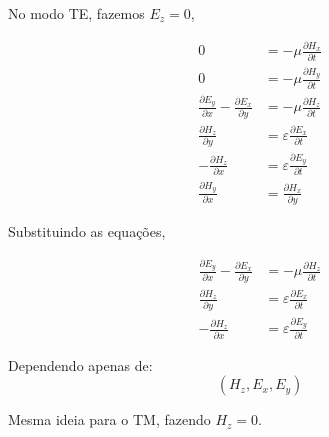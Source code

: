 No modo TE, fazemos $E_z = 0$, 

\begin{align*}
0 &= -\mu \frac{\partial H_x}{\partial t} \\
0 &= -\mu \frac{\partial H_y}{\partial t} \\
\frac{\partial E_y}{\partial x} - \frac{\partial E_x}{\partial y}
&= -\mu \frac{\partial H_z}{\partial t} \\
\frac{\partial H_z}{\partial y} &= \varepsilon \frac{\partial E_x}{\partial t} \\
-\frac{\partial H_z}{\partial x} &= \varepsilon \frac{\partial E_y}{\partial t} \\
\frac{\partial H_y}{\partial x} 
&= \frac{\partial H_x}{\partial y}
\end{align*}


Substituindo as equações, 

\begin{align*}
\frac{\partial E_y}{\partial x} - \frac{\partial E_x}{\partial y}
&= -\mu \frac{\partial H_z}{\partial t} \\
\frac{\partial H_z}{\partial y} &= \varepsilon \frac{\partial E_x}{\partial t} \\
-\frac{\partial H_z}{\partial x} &= \varepsilon \frac{\partial E_y}{\partial t}
\end{align*}


Dependendo apenas de:
\[
(H_z, E_x, E_y)
\]

Mesma ideia para o TM, fazendo $H_z = 0$.















